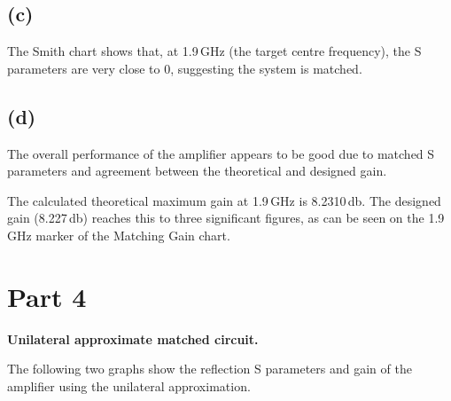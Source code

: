 \documentclass[12pt]{article}
\begin{document}
\subsection*{(c)}
The Smith chart shows that, at 1.9\,\unit{\giga\hertz} (the target centre frequency), the S parameters are very close to 0, 
suggesting the system is matched.  

\subsection*{(d)}
The overall performance of the amplifier appears to be good due to matched S parameters and agreement between the theoretical 
and designed gain.

The calculated theoretical maximum gain at 1.9\,\unit{\giga\hertz} is 8.2310\,\unit{\decibel}. The designed gain (8.227\,\unit{\decibel}) reaches this to three significant figures, 
as can be seen on the 1.9\,\unit{\giga\hertz} marker of the Matching Gain chart. 

\section*{Part 4}

\begin{center}

\textbf{Unilateral approximate matched circuit.}  
\end{center}

The following two graphs show the reflection S parameters and gain of the amplifier using the unilateral approximation. 
\end{document}
